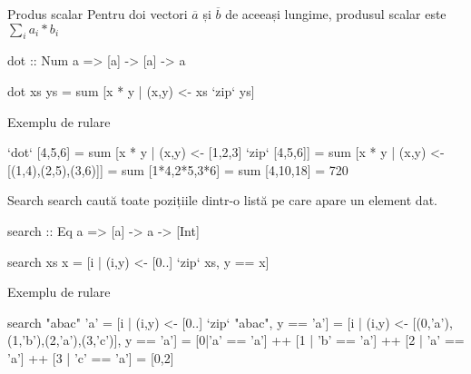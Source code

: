 \documentclass[handout,xcolor=pdftex,romanian,colorlinks]{beamer}
\begin{document}
\begin{frame}[fragile]{Produs scalar}
Pentru doi vectori $\overline{a}$ și $\overline{b}$ de aceeași lungime,
produsul scalar este $\displaystyle\sum_i a_i*b_i$
\begin{asciihs}
dot :: Num a => [a] -> [a] -> a
\end{asciihs}
\vspace{-2ex}
\begin{asciihs}
dot xs ys = sum [x * y | (x,y) <- xs `zip` ys]
\end{asciihs}

\begin{block}{Exemplu de rulare}
\begin{asciihs}
[1,2,3] `dot` [4,5,6] 
  = sum [x * y | (x,y) <- [1,2,3] `zip` [4,5,6]] 
  = sum [x * y | (x,y) <- [(1,4),(2,5),(3,6)]] 
  = sum [1*4,2*5,3*6] 
  = sum [4,10,18] 
  = 720
\end{asciihs}
\end{block}
\end{frame}

\begin{frame}[fragile]{Search}
search caută toate pozițiile dintr-o listă pe care apare un element dat.
\begin{asciihs}
search :: Eq a => [a] -> a -> [Int]
\end{asciihs}
\vspace{-2ex}
\begin{asciihs}
search xs x = [i | (i,y) <- [0..] `zip` xs, y == x]
\end{asciihs}

\begin{block}{Exemplu de rulare}
\begin{asciihs}
search "abac" 'a'
= [i | (i,y) <- [0..] `zip` "abac", y == 'a']
= [i | (i,y) <- [(0,'a'),(1,'b'),(2,'a'),(3,'c')], y == 'a']
= [0|'a' == 'a'] ++ [1 | 'b' == 'a'] ++ [2 | 'a' == 'a'] ++ [3 | 'c' == 'a']
= [0,2]
\end{asciihs}
\end{block}
\end{frame}
\end{document}
